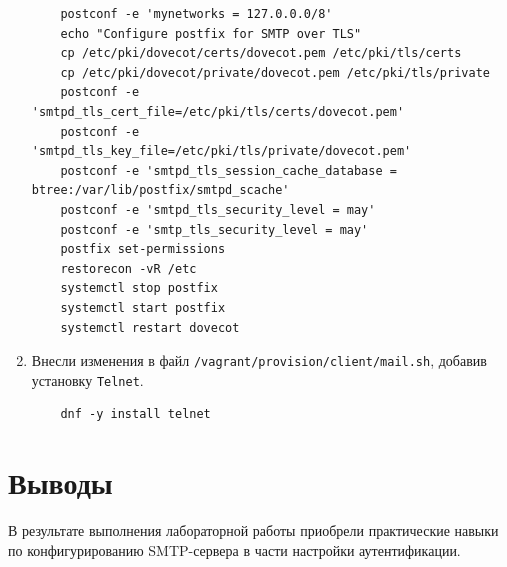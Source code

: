 \begin{enumerate}
\begin{verbatim}
    postconf -e 'mynetworks = 127.0.0.0/8'
    echo "Configure postfix for SMTP over TLS"
    cp /etc/pki/dovecot/certs/dovecot.pem /etc/pki/tls/certs
    cp /etc/pki/dovecot/private/dovecot.pem /etc/pki/tls/private
    postconf -e 'smtpd_tls_cert_file=/etc/pki/tls/certs/dovecot.pem'
    postconf -e 'smtpd_tls_key_file=/etc/pki/tls/private/dovecot.pem'
    postconf -e 'smtpd_tls_session_cache_database = btree:/var/lib/postfix/smtpd_scache'
    postconf -e 'smtpd_tls_security_level = may'
    postconf -e 'smtp_tls_security_level = may'
    postfix set-permissions
    restorecon -vR /etc
    systemctl stop postfix
    systemctl start postfix
    systemctl restart dovecot
  \end{verbatim}
\item Внесли изменения в файл \texttt{/vagrant/provision/client/mail.sh}, добавив установку \texttt{Telnet}.
  \begin{verbatim}
    dnf -y install telnet
  \end{verbatim}
\end{enumerate}

\section{Выводы}
В результате выполнения лабораторной работы приобрели практические навыки по конфигурированию SMTP-сервера в части настройки аутентификации.

